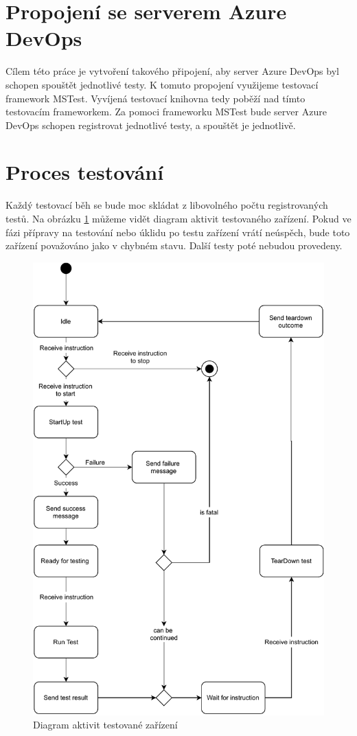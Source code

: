 \section{Propojení se serverem Azure DevOps}
Cílem této práce je vytvoření takového připojení, aby server Azure DevOps byl schopen spouštět jednotlivé testy. K tomuto propojení využijeme testovací framework MSTest. Vyvíjená testovací knihovna tedy poběží nad tímto testovacím frameworkem. Za pomoci frameworku MSTest bude server Azure DevOps schopen registrovat jednotlivé testy, a spouštět je jednotlivě.

\section{Proces testování}
Každý testovací běh se bude moc skládat z libovolného počtu registrovaných testů. Na obrázku \ref{fig:act_diag_device} můžeme vidět diagram aktivit testovaného zařízení. Pokud ve fázi přípravy na testování nebo úklidu po testu zařízení vrátí neúspěch, bude toto zařízení považováno jako v chybném stavu. Další testy poté nebudou provedeny.


\begin{figure}
    \centering 
    \includegraphics[width=\textwidth]{assets/img/activitydiagramdevice.pdf}
    \caption{Diagram aktivit testované zařízení}
    \label{fig:act_diag_device}
\end{figure}